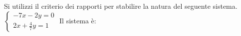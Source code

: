 Si utilizzi il criterio dei rapporti per stabilire la natura del seguente sistema.
$\left\{\begin{matrix}-7x-2y=0\\2x+\frac 4 7y=1\end{matrix}\right.$ 
Il sistema è: 
